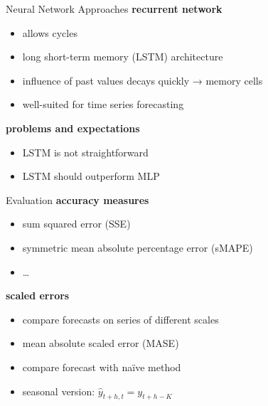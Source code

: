 \documentclass{beamer}
\begin{document}
  
  \begin{frame}{Neural Network Approaches}
    \textbf{recurrent network}
    \begin{itemize}
     \item allows cycles
     \item long short-term memory (LSTM) architecture
     \item influence of past values decays quickly → memory cells
     \item well-suited for time series forecasting
    \end{itemize}
    
    \textbf{problems and expectations}
    \begin{itemize}
     \item LSTM is not straightforward
     \item LSTM should outperform MLP
    \end{itemize}
  \end{frame}

  
  \begin{frame}{Evaluation}
    \textbf{accuracy measures}
    \begin{itemize}
     \item sum squared error (SSE)
     \item symmetric mean absolute percentage error (sMAPE)
     \item \ldots
    \end{itemize}
   
    \textbf{scaled errors}
    \begin{itemize}
     \item compare forecasts on series of different scales 
     \item mean absolute scaled error (MASE)
     \item compare forecast with naïve method 
     \item seasonal version: \(\hat{y}_{t+h,t} = y_{t+h-K}\) %
    \end{itemize}
  \end{frame}

  
  
\end{document}
